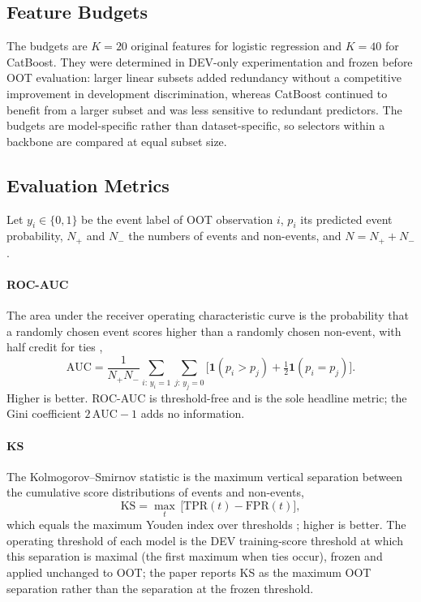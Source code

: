 \documentclass[final,5p,twocolumn]{elsarticle}
\newcommand{\Kfeat}{K}
\newcommand{\AUC}{\mathrm{AUC}}
\newcommand{\KS}{\mathrm{KS}}
\newcommand{\TPR}{\mathrm{TPR}}
\newcommand{\FPR}{\mathrm{FPR}}
\begin{document}
\subsection{Feature Budgets}
\label{subsec:feature_budgets}

The budgets are $\Kfeat=20$ original features for logistic regression and $\Kfeat=40$ for CatBoost. They were determined in DEV-only experimentation and frozen before OOT evaluation: larger linear subsets added redundancy without a competitive improvement in development discrimination, whereas CatBoost continued to benefit from a larger subset and was less sensitive to redundant predictors. The budgets are model-specific rather than dataset-specific, so selectors within a backbone are compared at equal subset size.

\subsection{Evaluation Metrics}
\label{subsec:metrics}

Let $y_i\in\{0,1\}$ be the event label of OOT observation $i$, $p_i$ its predicted event probability, $N_+$ and $N_-$ the numbers of events and non-events, and $N=N_++N_-$.

\paragraph{ROC-AUC}
The area under the receiver operating characteristic curve is the probability that a randomly chosen event scores higher than a randomly chosen non-event, with half credit for ties \cite{hanley1982},
\begin{equation}
    \AUC=\frac{1}{N_+N_-}\sum_{i:\,y_i=1}\sum_{j:\,y_j=0}\big[\mathbf{1}(p_i>p_j)+\tfrac12\mathbf{1}(p_i=p_j)\big].
    \label{eq:roc_auc}
\end{equation}
Higher is better. ROC-AUC is threshold-free and is the sole headline metric; the Gini coefficient $2\,\AUC-1$ adds no information.

\paragraph{KS}
The Kolmogorov--Smirnov statistic is the maximum vertical separation between the cumulative score distributions of events and non-events,
\begin{equation}
    \KS=\max_{t}\,\big[\TPR(t)-\FPR(t)\big],
    \label{eq:ks}
\end{equation}
which equals the maximum Youden index over thresholds \cite{youden1950}; higher is better. The operating threshold of each model is the DEV training-score threshold at which this separation is maximal (the first maximum when ties occur), frozen and applied unchanged to OOT; the paper reports KS as the maximum OOT separation rather than the separation at the frozen threshold.
\end{document}
